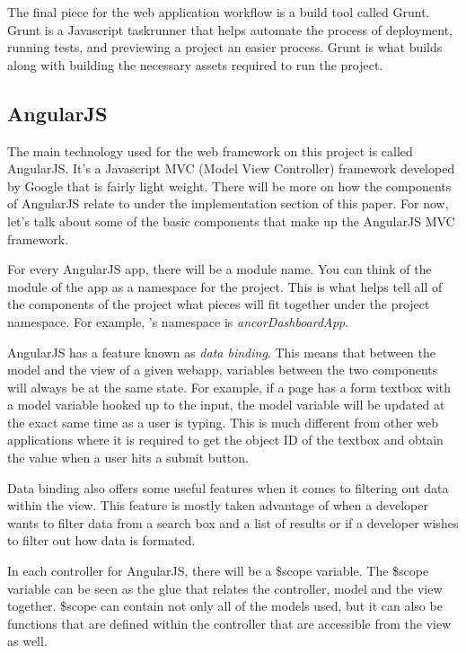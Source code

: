 The final piece for the web application workflow is a build tool called Grunt\cite{Note:Grunt:2014}. Grunt is a Javascript taskrunner that helps automate the process of deployment, running tests, and previewing a project an easier process. Grunt is what builds \projectName{} along with building the necessary assets required to run the project.

\subsection{AngularJS}

The main technology used for the web framework on this project is called AngularJS\cite{Note:AngularJS:2014}. It's a Javascript MVC (Model View Controller) framework developed by Google that is fairly light weight. There will be more on how the components of AngularJS relate to \projectName{} under the implementation section of this paper. For now, let’s talk about some of the basic components that make up the AngularJS MVC framework.

For every AngularJS app, there will be a module name. You can think of the module of the app as a namespace for the project. This is what helps tell all of the components of the project what pieces will fit together under the project namespace. For example, \projectName{}’s namespace is \emph{ancorDashboardApp}.

AngularJS has a feature known as \emph{data binding}. This means that between the model and the view of a given webapp, variables between the two components will always be at the same state. For example, if a page has a form textbox with a model variable hooked up to the input, the model variable will be updated at the exact same time as a user is typing. This is much different from other web applications where it is required to get the object ID of the textbox and obtain the value when a user hits a submit button.

Data binding also offers some useful features when it comes to filtering out data within the view. This feature is mostly taken advantage of when a developer wants to filter data from a search box and a list of results or if a developer wishes to filter out how data is formated.

In each controller for AngularJS, there will be a \$scope variable. The \$scope variable can be seen as the glue that relates the controller, model and the view together. \$scope can contain not only all of the models used, but it can also be functions that are defined within the controller that are accessible from the view as well.

